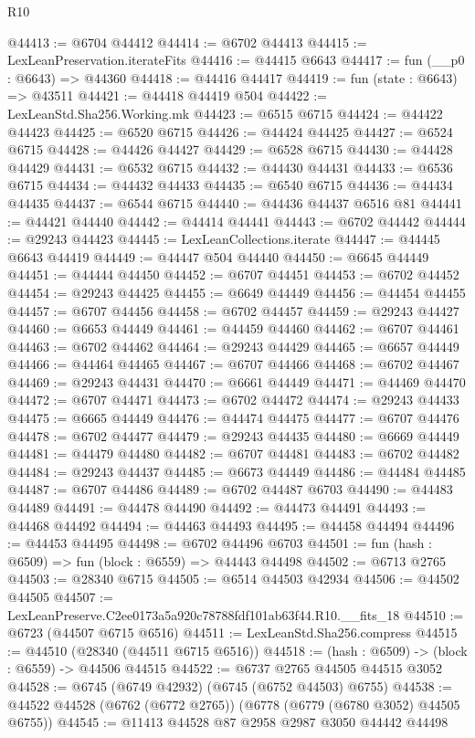 \begin{lexlean}{R10}
\begin{coremodule}
@44413 := @6704 @44412
@44414 := @6702 @44413
@44415 := LexLeanPreservation.iterateFits
@44416 := @44415 @6643
@44417 := fun (__p0 : @6643) => @44360
@44418 := @44416 @44417
@44419 := fun (state : @6643) => @43511
@44421 := @44418 @44419 @504
@44422 := LexLeanStd.Sha256.Working.mk
@44423 := @6515 @6715
@44424 := @44422 @44423
@44425 := @6520 @6715
@44426 := @44424 @44425
@44427 := @6524 @6715
@44428 := @44426 @44427
@44429 := @6528 @6715
@44430 := @44428 @44429
@44431 := @6532 @6715
@44432 := @44430 @44431
@44433 := @6536 @6715
@44434 := @44432 @44433
@44435 := @6540 @6715
@44436 := @44434 @44435
@44437 := @6544 @6715
@44440 := @44436 @44437 @6516 @81
@44441 := @44421 @44440
@44442 := @44414 @44441
@44443 := @6702 @44442
@44444 := @29243 @44423
@44445 := LexLeanCollections.iterate
@44447 := @44445 @6643 @44419
@44449 := @44447 @504 @44440
@44450 := @6645 @44449
@44451 := @44444 @44450
@44452 := @6707 @44451
@44453 := @6702 @44452
@44454 := @29243 @44425
@44455 := @6649 @44449
@44456 := @44454 @44455
@44457 := @6707 @44456
@44458 := @6702 @44457
@44459 := @29243 @44427
@44460 := @6653 @44449
@44461 := @44459 @44460
@44462 := @6707 @44461
@44463 := @6702 @44462
@44464 := @29243 @44429
@44465 := @6657 @44449
@44466 := @44464 @44465
@44467 := @6707 @44466
@44468 := @6702 @44467
@44469 := @29243 @44431
@44470 := @6661 @44449
@44471 := @44469 @44470
@44472 := @6707 @44471
@44473 := @6702 @44472
@44474 := @29243 @44433
@44475 := @6665 @44449
@44476 := @44474 @44475
@44477 := @6707 @44476
@44478 := @6702 @44477
@44479 := @29243 @44435
@44480 := @6669 @44449
@44481 := @44479 @44480
@44482 := @6707 @44481
@44483 := @6702 @44482
@44484 := @29243 @44437
@44485 := @6673 @44449
@44486 := @44484 @44485
@44487 := @6707 @44486
@44489 := @6702 @44487 @6703
@44490 := @44483 @44489
@44491 := @44478 @44490
@44492 := @44473 @44491
@44493 := @44468 @44492
@44494 := @44463 @44493
@44495 := @44458 @44494
@44496 := @44453 @44495
@44498 := @6702 @44496 @6703
@44501 := fun (hash : @6509) => fun (block : @6559) => @44443 @44498
@44502 := @6713 @2765
@44503 := @28340 @6715
@44505 := @6514 @44503 @42934
@44506 := @44502 @44505
@44507 := LexLeanPreserve.C2ee0173a5a920c78788fdf101ab63f44.R10.__fits_18
@44510 := @6723 (@44507 @6715 @6516)
@44511 := LexLeanStd.Sha256.compress
@44515 := @44510 (@28340 (@44511 @6715 @6516))
@44518 := (hash : @6509) -> (block : @6559) -> @44506 @44515
@44522 := @6737 @2765 @44505 @44515 @3052
@44528 := @6745 (@6749 @42932) (@6745 (@6752 @44503) @6755)
@44538 := @44522 @44528 (@6762 (@6772 @2765)) (@6778 (@6779 (@6780 @3052) @44505 @6755))
@44545 := @11413 @44528 @87 @2958 @2987 @3050 @44442 @44498

\end{coremodule}
\end{lexlean}
